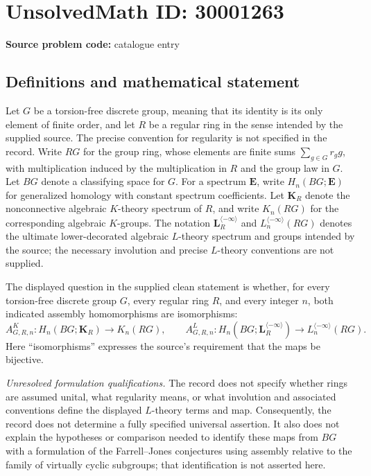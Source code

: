 \documentclass[11pt]{article}
\begin{document}
\section*{UnsolvedMath ID: 30001263}
\textbf{Source problem code:} catalogue entry
\subsection{Definitions and mathematical statement}
Let \(G\) be a torsion-free discrete group, meaning that its identity is its only element of finite order, and let \(R\) be a regular ring in the sense intended by the supplied source. The precise convention for regularity is not specified in the record. Write \(RG\) for the group ring, whose elements are finite sums \(\sum_{g\in G}r_g g\), with multiplication induced by the multiplication in \(R\) and the group law in \(G\). Let \(BG\) denote a classifying space for \(G\). For a spectrum \(\mathbf E\), write \(H_n(BG;\mathbf E)\) for generalized homology with constant spectrum coefficients. Let \(\mathbf K_R\) denote the nonconnective algebraic \(K\)-theory spectrum of \(R\), and write \(K_n(RG)\) for the corresponding algebraic \(K\)-groups. The notation \(\mathbf L_R^{\langle-\infty\rangle}\) and \(L_n^{\langle-\infty\rangle}(RG)\) denotes the ultimate lower-decorated algebraic \(L\)-theory spectrum and groups intended by the source; the necessary involution and precise \(L\)-theory conventions are not supplied.

The displayed question in the supplied clean statement is whether, for every torsion-free discrete group \(G\), every regular ring \(R\), and every integer \(n\), both indicated assembly homomorphisms are isomorphisms:
\[
 A^K_{G,R,n}\colon H_n(BG;\mathbf K_R)\longrightarrow K_n(RG),
 \qquad
 A^L_{G,R,n}\colon H_n(BG;\mathbf L_R^{\langle-\infty\rangle})\longrightarrow L_n^{\langle-\infty\rangle}(RG).
\]
Here ``isomorphisms'' expresses the source's requirement that the maps be bijective.

\emph{Unresolved formulation qualifications.} The record does not specify whether rings are assumed unital, what regularity means, or what involution and associated conventions define the displayed \(L\)-theory terms and map. Consequently, the record does not determine a fully specified universal assertion. It also does not explain the hypotheses or comparison needed to identify these maps from \(BG\) with a formulation of the Farrell--Jones conjectures using assembly relative to the family of virtually cyclic subgroups; that identification is not asserted here.
\end{document}

